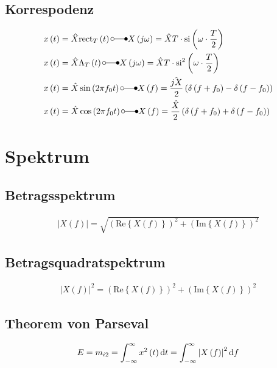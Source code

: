 \newpage
\subsection*{Korrespodenz}
\begin{align*}
x\left(t\right) &=\hat{X}\mathrm{rect}_{T}\left(t\right) \laplace X\left(j\omega\right)
=\hat{X}T\cdot\mathrm{si}\left({\omega\cdot\frac{T}{2}}\right)\\
x\left(t\right) &=\hat{X}\Lambda_{T}\left(t\right) \laplace X\left(j\omega\right)
=\hat{X}T\cdot\mathrm{si}^2\left({\omega\cdot\frac{T}{2}}\right)\\
x\left(t\right) &=\hat{X}\sin\left(2\pi f_0 t\right) \laplace X\left(f\right)
=\frac{\hat{jX}}{2}\left(\delta\left(f+f_0\right)-\delta\left(f-f_0\right)\right)\\
x\left(t\right) &=\hat{X}\cos\left(2\pi f_0 t\right) \laplace X\left(f\right)
=\frac{\hat{X}}{2}\left(\delta\left(f+f_0\right)+\delta\left(f-f_0\right)\right)
\end{align*}

\section*{Spektrum}
\subsection*{Betragsspektrum}
\begin{align*}
\left|X\left(f\right)\right|=\sqrt{\left(\text{Re}\left\{X\left(f\right)\right\}\right)^2+\left(\text{Im}\left\{X\left(f\right)\right\}\right)^2}
\end{align*}

\subsection*{Betragsquadratspektrum}
\begin{align*}
\left|X\left(f\right)\right|^2 =\left(\text{Re}\left\{X\left(f\right)\right\}\right)^2+\left(\text{Im}\left\{X\left(f\right)\right\}\right)^2
\end{align*}

\subsection*{Theorem von Parseval}
\begin{align*}
E =m_{i2}=\int_{-\infty}^\infty x^2\left(t\right)\mathop{}\!\mathrm{d} t=\int_{-\infty}^\infty \left|X\left(f\right)\right|^2\mathop{}\!\mathrm{d} f
\end{align*}

